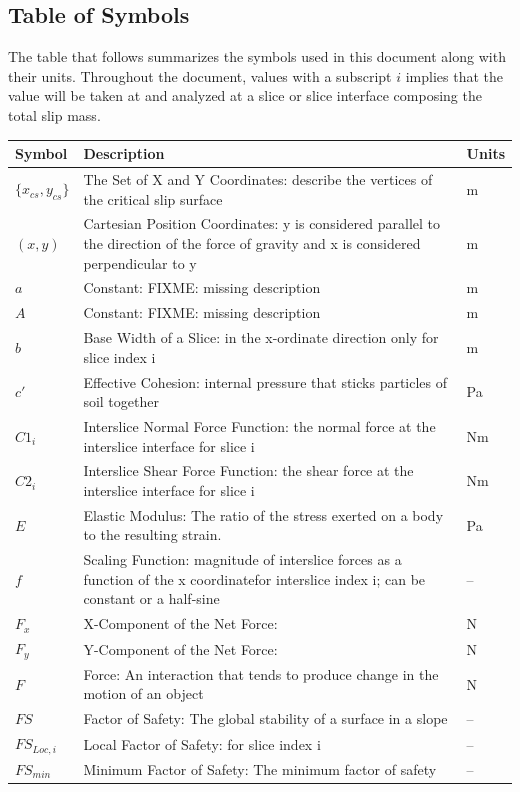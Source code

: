 \documentclass[12pt]{article}
\begin{document}
\subsection{Table of Symbols}
\label{Sec:ToS}
The table that follows summarizes the symbols used in this document along with their units. Throughout the document, values with a subscript $i$ implies that the value will be taken at and analyzed at a slice or slice interface composing the total slip mass.
\begin{longtabu}{l X[l] l}
\toprule
Symbol & Description & Units
\\
\midrule
$\{{x_{cs}}{,y_{cs}}\}$ & The Set of X and Y Coordinates: describe the vertices of the critical slip surface & m
\\
$(x,y)$ & Cartesian Position Coordinates: y is considered parallel to the direction of the force of gravity and x is considered perpendicular to y & m
\\
$a$ & Constant: FIXME: missing description & m
\\
$A$ & Constant: FIXME: missing description & m
\\
$b$ & Base Width of a Slice: in the x-ordinate direction only for slice index i & m
\\
$c'$ & Effective Cohesion: internal pressure that sticks particles of soil together & Pa
\\
${C1_{i}}$ & Interslice Normal Force Function: the normal force at the interslice interface for slice i & Nm
\\
${C2_{i}}$ & Interslice Shear Force Function: the shear force at the interslice interface for slice i & Nm
\\
$E$ & Elastic Modulus: The ratio of the stress exerted on a body to the resulting strain. & Pa
\\
$f$ & Scaling Function: magnitude of interslice forces as a function of the x coordinatefor interslice index i; can be constant or a half-sine & --
\\
${F_{x}}$ & X-Component of the Net Force:  & N
\\
${F_{y}}$ & Y-Component of the Net Force:  & N
\\
$F$ & Force: An interaction that tends to produce change in the motion of an object & N
\\
$FS$ & Factor of Safety: The global stability of a surface in a slope & --
\\
${FS_{Loc,i}}$ & Local Factor of Safety: for slice index i & --
\\
${FS_{min}}$ & Minimum Factor of Safety: The minimum factor of safety & --

\end{longtabu}
\end{document}
